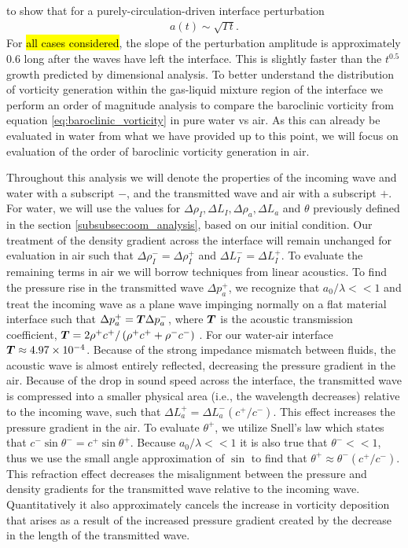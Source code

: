 to show that for a purely-circulation-driven interface perturbation
% 
\begin{align} \label{eq:intf_circ_scaling}
  a(t) \sim \sqrt{\Gamma t}.
\end{align}
% 
For \hl{all cases considered}, the slope of the perturbation amplitude
is approximately $0.6$ long after the waves have left the
interface. This is slightly faster than the $t^{0.5}$ growth predicted by
dimensional analysis. 
% 
% 
To better understand the distribution of vorticity generation within
the gas-liquid mixture region of the interface we perform an order of
magnitude analysis to compare the baroclinic vorticity from equation
\eqref{eq:baroclinic_vorticity} in pure water vs air. As this can
already be evaluated in water from what we have provided up to this
point, we will focus on evaluation of the order of baroclinic
vorticity generation in air.

Throughout this analysis we will denote the properties of the incoming
wave and water with a subscript $-$, and the transmitted wave and air
with a subscript $+$. For water, we will use the values for
$\Delta \rho_I, \Delta L_I, \Delta \rho_a, \Delta L_a$ and $\theta$
previously defined in the section \ref{subsubsec:oom_analysis}, based
on our initial condition. Our treatment of the density gradient across
the interface will remain unchanged for evaluation in air such that
$\Delta \rho_I^-=\Delta \rho_I^+$ and $\Delta L_I^-=\Delta L_I^+$. To
evaluate the remaining terms in air we will borrow techniques from
linear acoustics. To find the pressure rise in the transmitted wave
$\Delta p_a^+$, we recognize that $a_0/\lambda<<1$ and treat the
incoming wave as a plane wave impinging normally on a flat material
interface such that $\Delta p_a^+=\boldsymbol{T} \Delta p_a^-$, where $\boldsymbol{T}$
is the acoustic transmission coefficient,
$\boldsymbol{T}=2\rho^+ c^+/\left(\rho^+ c^+ + \rho^- c^- \right)$
\citep{Kinsler1982}. For our water-air interface
$\boldsymbol{T}\approx4.97\times10^{-4}$. Because of the strong impedance
mismatch between fluids, the acoustic wave is almost entirely
reflected, decreasing the pressure gradient in the air. Because of the
drop in sound speed across the interface, the transmitted wave is
compressed into a smaller physical area (i.e., the wavelength
decreases) relative to the incoming wave, such that
$\Delta L_a^+=\Delta L_a^- (c^+/c^-)$. This effect increases the
pressure gradient in the air. To evaluate $\theta^+$, we utilize
Snell's law which states that
$c^-\sin{\theta^-}=c^+\sin{\theta^+}$. Because $a_0/\lambda<<1$ it is
also true that $\theta^-<<1$, thus we use the small angle
approximation of $\sin$ to find that
$\theta^+\approx\theta^-(c^+/c^-)$. This refraction effect decreases
the misalignment between the pressure and density gradients for the
transmitted wave relative to the incoming wave. Quantitatively it also
approximately cancels the increase in vorticity deposition that arises
as a result of the increased pressure gradient created by the decrease
in the length of the transmitted wave.

